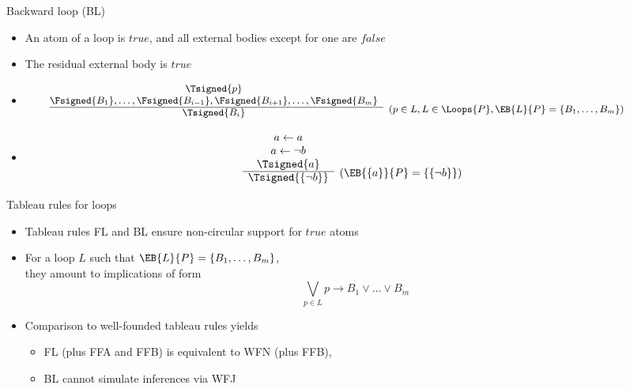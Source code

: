 \begin{frame}{Backward loop (BL)}

\begin{itemize}
\item {} An atom of a loop is $\mathit{true}$,
  and all external bodies except for one are $\mathit{false}$
\item {} The residual external body is $\mathit{true}$
\item {}
\[
\hspace{-10mm}
{\small
\begin{array}{@{}cl}
\Tsigned{p} \\
\Fsigned{B_1},\dots,\Fsigned{B_{i-1}},\Fsigned{B_{i+1}},\dots,\Fsigned{B_m} &
\raisebox{-8pt}[0pt][0pt]{($p \in L, L \in \Loops{P}, \EB{L}{P}=\{B_1,\dots,B_m\}$)}
\\\cline{1-1}
\Tsigned{B_i}
\end{array}
}
\]
\item<2-> 
\[
\begin{array}{cl}
a \leftarrow a \\
a \leftarrow \neg b \\
\Tsigned{a}&
\raisebox{-8pt}[0pt][0pt]{($\EB{\{a\}}{P}=\{\{\neg b\}\}$)}
\\\cline{1-1}
\Tsigned{\{\neg b\}}
\end{array}
\]
\end{itemize}
\end{frame}
\begin{frame}{Tableau rules for loops}
  \begin{itemize}
  \item<1-> Tableau rules FL and BL ensure non-circular support for $\mathit{true}$ atoms
  \item<2-> For a loop $L$ such that $\EB{L}{P}=\{B_1,\dots,B_m\}$,\\
    they amount to implications of form
    \[
    \textstyle\bigvee_{p\in L} p \rightarrow B_1 \vee\dots\vee B_m
    \]
  \item<3-> Comparison to well-founded tableau rules yields
    \begin{itemize}
    \item FL (plus FFA and FFB) is equivalent to WFN (plus FFB),
    \item BL cannot simulate inferences via WFJ
    \end{itemize}
  \end{itemize}
\end{frame}
